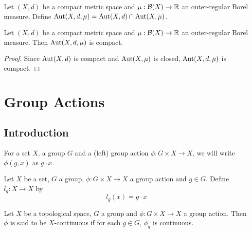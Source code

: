 \documentclass{book}
\begin{document}
	\begin{defn} \ld{}
	Let $(X,d)$ be a compact metric space and $\mu: \mathcal{B}(X) \rightarrow \mathbb{R}$ an outer-regular Borel measure. Define $\operatorname{Aut}(X, d, \mu) = \operatorname{Aut}(X, d) \cap \operatorname{Aut}(X, \mu)$.
	\end{defn}
	
	\begin{ex} \lex{}
	Let $(X,d)$ be a compact metric space and $\mu: \mathcal{B}(X) \rightarrow \mathbb{R}$ an outer-regular Borel measure. Then $\operatorname{Aut}(X, d, \mu)$ is compact.
	\end{ex}
	
	\begin{proof}
	Since $\operatorname{Aut}(X, d)$ is compact and $\operatorname{Aut}(X, \mu)$ is closed, $\operatorname{Aut}(X, d, \mu)$ is compact.
	\end{proof}
	
	
	
	
	
	
	
	
	
	
	
	
	
	

	
	
	
	
	
	
	
	
	
	
	\newpage
	\chapter{Group Actions}
	
	\section{Introduction}
	\begin{note}
	For a set $X$, a group $G$ and a (left) group action $\phi: G \times X \rightarrow X$, we will write $\phi(g, x)$ as $g \cdot x$.
	\end{note}	
	
	\begin{defn}  
		Let $X$ be a set, $G$ a group, $\phi: G \times X \rightarrow X$ a group action and $g \in G$. Define $l_g:X \rightarrow X$ by 
		\begin{equation*}
		l_g(x) = g \cdot x
		\end{equation*}
	\end{defn}
	
	\begin{defn}
	Let $X$ be a topological space, $G$ a group and $\phi: G \times X \rightarrow X$ a group action. Then $\phi$ is said to be $X$-continuous if for each $g \in G$, $\phi_g$ is continuous.
	\end{defn}
	
\end{document}
